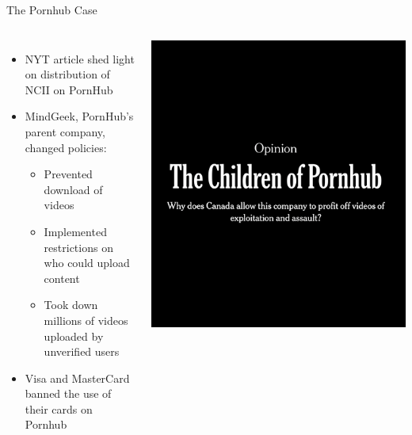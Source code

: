\documentclass[nobackground,dvipsnames,table,aspectratio=169]{beamer}
\begin{document}
\begin{frame}{The Pornhub Case}
    \begin{columns}
            \begin{itemize}
                \item NYT article shed light on distribution of NCII on PornHub
                \item MindGeek, PornHub’s parent company, changed policies:
                \begin{itemize}
                    \item Prevented download of videos
                    \item Implemented restrictions on who could upload content
                    \item Took down millions of videos uploaded by unverified users
                \end{itemize}
                \item Visa and MasterCard banned the use of their cards on Pornhub
            \end{itemize}
            \includegraphics[width=\textwidth]{pornhub-nyt-article}
    \end{columns}
\end{frame}
\end{document}
